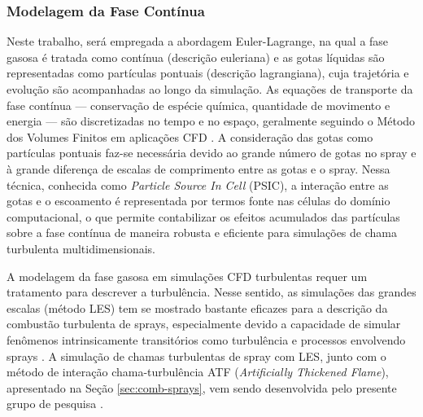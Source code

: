 \subsubsection{Modelagem da Fase Contínua} \label{sec:gas}

Neste trabalho, será empregada a abordagem Euler-Lagrange, na qual a fase gasosa é tratada como contínua (descrição euleriana) e as gotas líquidas são representadas como partículas pontuais (descrição lagrangiana), cuja trajetória e evolução são acompanhadas ao longo da simulação. 
As equações de transporte da fase contínua — conservação de espécie química, quantidade de movimento e energia — são discretizadas no tempo e no espaço, geralmente seguindo o Método dos Volumes Finitos  em aplicações CFD \cite{Anderson2009}.
A consideração das gotas como partículas pontuais faz-se necessária devido ao grande número de gotas no spray e à grande diferença de escalas de comprimento entre as gotas e o spray.
Nessa técnica, conhecida como \emph{Particle Source In Cell} (PSIC), a interação entre as gotas e o escoamento é representada por termos fonte nas células do domínio computacional, o que permite contabilizar os efeitos acumulados das partículas sobre a fase contínua de maneira robusta e eficiente para simulações de chama turbulenta multidimensionais.

A modelagem da fase gasosa em simulações CFD turbulentas requer um tratamento para descrever a turbulência. 
Nesse sentido, as simulações das grandes escalas (método LES) tem se mostrado bastante eficazes para a descrição da combustão turbulenta de sprays, especialmente devido a capacidade de simular fenômenos intrinsicamente transitórios como turbulência e processos envolvendo sprays \cite{SacomanoF2020CF}.
A simulação de chamas turbulentas de spray com LES, junto com o método de interação chama-turbulência ATF (\emph{Artificially Thickened Flame}), apresentado na Seção \ref{sec:comb-sprays}, vem sendo desenvolvida pelo presente grupo de pesquisa \cite{SacomanoF2017PhD,SacomanoF2017CF,SacomanoF2018CTM,SacomanoF2019Fluids,SacomanoF2020CF}.

